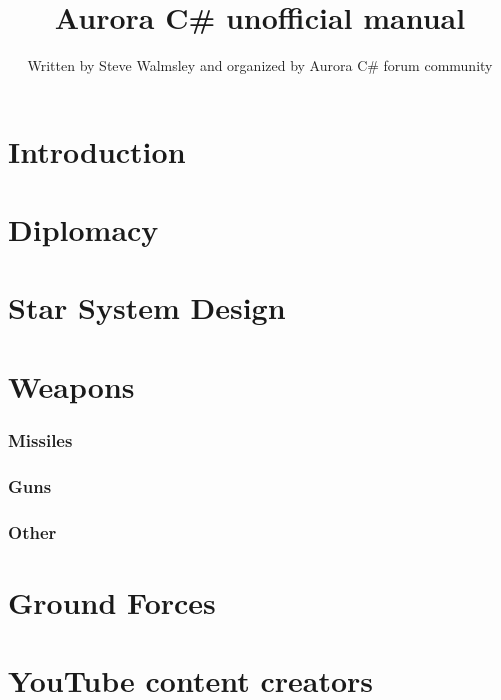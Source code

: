 \documentclass[10pt,a4paper,oneside]{article}
\author{Written by Steve Walmsley and organized by Aurora C\# forum community}
\title{Aurora C\# unofficial manual}
\begin{document}
\maketitle
\newpage
\tableofcontents

\newpage
\part{Introduction}


\newpage
\part{Diplomacy}



\newpage
\part{Star System Design}


\newpage
\part{Weapons}

\section{Missiles}


\section{Guns}


\section{Other}


\newpage
\part{Ground Forces}


\newpage
\part{YouTube content creators}

\end{document}
